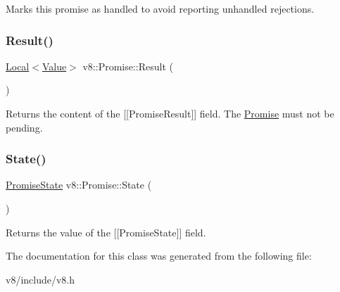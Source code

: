Marks this promise as handled to avoid reporting unhandled rejections. \mbox{\label{classv8_1_1Promise_a94aceab6e2ad55f37e6997b4dcac2f11}} 
\subsubsection{\texorpdfstring{Result()}{Result()}}
{\footnotesize\ttfamily \mbox{\hyperlink{classv8_1_1Local}{Local}}$<$\mbox{\hyperlink{classv8_1_1Value}{Value}}$>$ v8\+::\+Promise\+::\+Result (\begin{DoxyParamCaption}{ }\end{DoxyParamCaption})}

Returns the content of the \mbox{[}\mbox{[}Promise\+Result\mbox{]}\mbox{]} field. The \mbox{\hyperlink{classv8_1_1Promise}{Promise}} must not be pending. \mbox{\label{classv8_1_1Promise_abc011691f131e23939b167a4fe3f9391}} 
\subsubsection{\texorpdfstring{State()}{State()}}
{\footnotesize\ttfamily \mbox{\hyperlink{classv8_1_1Promise_a0c357b9d99a634f98a5a203b0a322544}{Promise\+State}} v8\+::\+Promise\+::\+State (\begin{DoxyParamCaption}{ }\end{DoxyParamCaption})}

Returns the value of the \mbox{[}\mbox{[}Promise\+State\mbox{]}\mbox{]} field. 

The documentation for this class was generated from the following file\+:\begin{DoxyCompactItemize}
\item 
v8/include/v8.\+h\end{DoxyCompactItemize}
